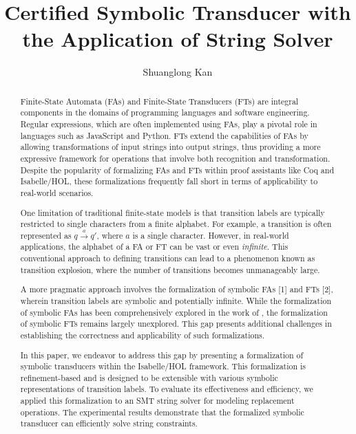 \documentclass[a4paper,UKenglish,cleveref, autoref, thm-restate]{lipics-v2021}
\title{Certified Symbolic Transducer with the Application of String Solver} %
\author{Shuanglong Kan}{Barkhausen Institut, Germany \and \url{https://github.com/ShlKan} }{shuanglongkan@gmail.com}{https://orcid.org/0000-0002-1825-0097}{(Optional) author-specific funding acknowledgements}%
\begin{document}
\maketitle

\begin{abstract}
Finite-State Automata (FAs) and Finite-State Transducers (FTs) are integral components in the domains of programming languages and software engineering. Regular expressions, which are often implemented using FAs, play a pivotal role in languages such as JavaScript and Python. FTs extend the capabilities of FAs by allowing transformations of input strings into output strings, thus providing a more expressive framework for operations that involve both recognition and transformation. Despite the popularity of formalizing FAs and FTs within proof assistants like Coq and Isabelle/HOL, these formalizations frequently fall short in terms of applicability to real-world scenarios.

One limitation of traditional finite-state models is that transition labels are typically restricted to single characters from a finite alphabet. For example, a transition is often represented as $q \xrightarrow{a} q'$, where $a$ is a single character. However, in real-world applications, the alphabet of a FA or FT can be vast or even \emph{infinite}. This conventional approach to defining transitions can lead to a phenomenon known as transition explosion, where the number of transitions becomes unmanageably large.


A more pragmatic approach involves the formalization of symbolic FAs [1] and FTs [2], wherein transition labels are symbolic and potentially infinite. While the formalization of symbolic FAs has been comprehensively explored in the work of \cite{cpp/KanLRS22}, the formalization of symbolic FTs remains largely unexplored. This gap presents additional challenges in establishing the correctness and applicability of such formalizations.

In this paper, we endeavor to address this gap by presenting a formalization of symbolic transducers within the Isabelle/HOL framework. This formalization is refinement-based and is designed to be extensible with various symbolic representations of transition labels. To evaluate its effectiveness and efficiency, we applied this formalization to an SMT string solver for modeling replacement operations. The experimental results demonstrate that the formalized symbolic transducer can efficiently solve string constraints.


\end{abstract}
\end{document}
